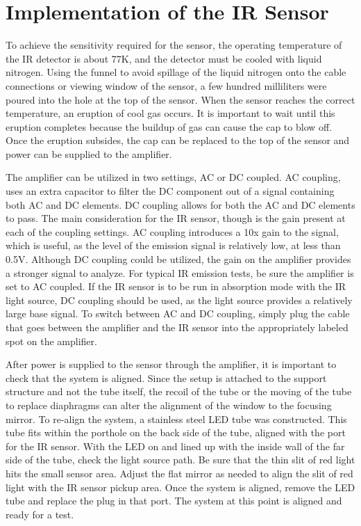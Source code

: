 
\chapter{Implementation of the IR Sensor} %

\label{Appendix 2} %

To achieve the sensitivity required for the sensor, the operating temperature of the IR detector is about 77K, and the detector must be cooled with liquid nitrogen. Using the funnel to avoid spillage of the liquid nitrogen onto the cable connections or viewing window of the sensor, a few hundred milliliters were poured into the hole at the top of the sensor. When the sensor reaches the correct temperature, an eruption of cool gas occurs. It is important to wait until this eruption completes because the buildup of gas can cause the cap to blow off. Once the eruption subsides, the cap can be replaced to the top of the sensor and power can be supplied to the amplifier. 

The amplifier can be utilized in two settings, AC or DC coupled. AC coupling, uses an extra capacitor to filter the DC component out of a signal containing both AC and DC elements. DC coupling allows for both the AC and DC elements to pass. The main consideration for the IR sensor, though is the gain present at each of the coupling settings. AC coupling introduces a 10x gain to the signal, which is useful, as the level of the emission signal is relatively low, at less than 0.5V. Although DC coupling could be utilized, the gain on the amplifier provides a stronger signal to analyze. For typical IR emission tests, be sure the amplifier is set to AC coupled. If the IR sensor is to be run in absorption mode with the IR light source, DC coupling should be used, as the light source provides a relatively large base signal. To switch between AC and DC coupling, simply plug the cable that goes between the amplifier and the IR sensor into the appropriately labeled spot on the amplifier.

After power is supplied to the sensor through the amplifier, it is important to check that the system is aligned. Since the setup is attached to the support structure and not the tube itself, the recoil of the tube or the moving of the tube to replace diaphragms can alter the alignment of the window to the focusing mirror. To re-align the system, a stainless steel LED tube was constructed. This tube fits within the porthole on the back side of the tube, aligned with the port for the IR sensor. With the LED on and lined up with the inside wall of the far side of the tube, check the light source path. Be sure that the thin slit of red light hits the small sensor area. Adjust the flat mirror as needed to align the slit of red light with the IR sensor pickup area. Once the system is aligned, remove the LED tube and replace the plug in that port. The system at this point is aligned and ready for a test.  

